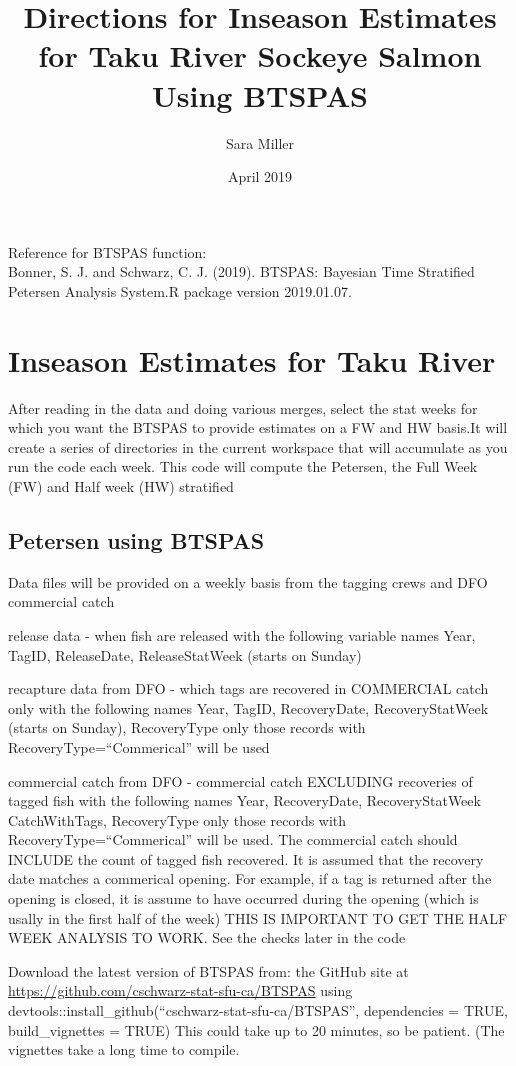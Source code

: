 \documentclass[]{article}
\title{Directions for Inseason Estimates for Taku River Sockeye Salmon Using
BTSPAS}
\author{Sara Miller}
\date{April 2019}
\begin{document}
\maketitle

Reference for BTSPAS function:\\
Bonner, S. J. and Schwarz, C. J. (2019). BTSPAS: Bayesian Time
Stratified Petersen Analysis System.R package version 2019.01.07.

\section{Inseason Estimates for Taku
River}\label{inseason-estimates-for-taku-river}

After reading in the data and doing various merges, select the stat
weeks for which you want the BTSPAS to provide estimates on a FW and HW
basis.It will create a series of directories in the current workspace
that will accumulate as you run the code each week. This code will
compute the Petersen, the Full Week (FW) and Half week (HW) stratified

\subsection{Petersen using BTSPAS}\label{petersen-using-btspas}

Data files will be provided on a weekly basis from the tagging crews and
DFO commercial catch

release data - when fish are released with the following variable names
Year, TagID, ReleaseDate, ReleaseStatWeek (starts on Sunday)

recapture data from DFO - which tags are recovered in COMMERCIAL catch
only with the following names Year, TagID, RecoveryDate,
RecoveryStatWeek (starts on Sunday), RecoveryType only those records
with RecoveryType=``Commerical'' will be used

commercial catch from DFO - commercial catch EXCLUDING recoveries of
tagged fish with the following names Year, RecoveryDate,
RecoveryStatWeek CatchWithTags, RecoveryType only those records with
RecoveryType=``Commerical'' will be used. The commercial catch should
INCLUDE the count of tagged fish recovered. It is assumed that the
recovery date matches a commerical opening. For example, if a tag is
returned after the opening is closed, it is assume to have occurred
during the opening (which is usally in the first half of the week) THIS
IS IMPORTANT TO GET THE HALF WEEK ANALYSIS TO WORK. See the checks later
in the code

Download the latest version of BTSPAS from: the GitHub site at
\url{https://github.com/cschwarz-stat-sfu-ca/BTSPAS} using
devtools::install\_github(``cschwarz-stat-sfu-ca/BTSPAS'', dependencies
= TRUE, build\_vignettes = TRUE) This could take up to 20 minutes, so be
patient. (The vignettes take a long time to compile.
\end{document}

